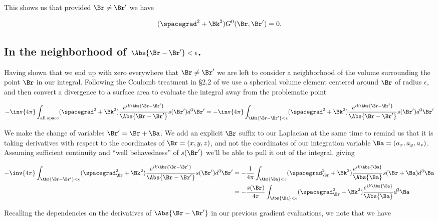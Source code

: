 This shows us that provided $\Br \ne \Br'$ we have

\begin{equation}\label{eqn:helmholtzGreens:35}
(\spacegrad^2 + \Bk^2) G^0(\Br, \Br') = 0.
\end{equation}

\subsection{In the neighborhood of $\Abs{\Br - \Br'} < \epsilon$.}

Having shown that we end up with zero everywhere that $\Br \ne \Br'$ we are left to consider a neighborhood of the volume surrounding the point $\Br$ in our integral.  Following the Coulomb treatment in \S 2.2 of \cite{schwartz1987pe} we use a spherical volume element centered around $\Br$ of radius $\epsilon$, and then convert a divergence to a surface area to evaluate the integral away from the problematic point

\begin{equation}\label{eqn:helmoltzGreens:50}
-\inv{4\pi} \int_{\text{all space}} (\spacegrad^2 + \Bk^2) \frac{e^{i k \Abs{\Br - \Br'}}}{\Abs{\Br - \Br'}} s(\Br') d^3 \Br'
=
-\inv{4\pi} \int_{\Abs{\Br - \Br'} < \epsilon} (\spacegrad^2 + \Bk^2) \frac{e^{i k \Abs{\Br - \Br'}}}{\Abs{\Br - \Br'}} s(\Br') d^3 \Br'
\end{equation}

We make the change of variables $\Br' = \Br + \Ba$.  We add an explicit $\Br$ suffix to our Laplacian at the same time to remind us that it is taking derivatives with respect to the coordinates of $\Br = (x, y, z)$, and not the coordinates of our integration variable $\Ba = (a_x, a_y, a_z)$.  Assuming sufficient continuity and ``well behavedness'' of $s(\Br')$ we'll be able to pull it out of the integral, giving

\begin{align*}
-\inv{4\pi} \int_{\Abs{\Br - \Br'} < \epsilon} (\spacegrad_\Br^2 + \Bk^2) \frac{e^{i k \Abs{\Br - \Br'}}}{\Abs{\Br - \Br'}} s(\Br') d^3 \Br'
&= 
-\frac{1}{4\pi} \int_{\Abs{\Ba} < \epsilon} (\spacegrad_\Br^2 + \Bk^2) \frac{e^{i k \Abs{\Ba}}}{\Abs{\Ba}} s(\Br + \Ba) d^3 \Ba \\
&= 
-\frac{s(\Br)}{4\pi} \int_{\Abs{\Ba} < \epsilon} (\spacegrad_\Br^2 + \Bk^2) \frac{e^{i k \Abs{\Ba}}}{\Abs{\Ba}} d^3 \Ba 
\end{align*}

Recalling the dependencies on the derivatives of $\Abs{\Br - \Br'}$ in our previous gradient evaluations, we note that we have

